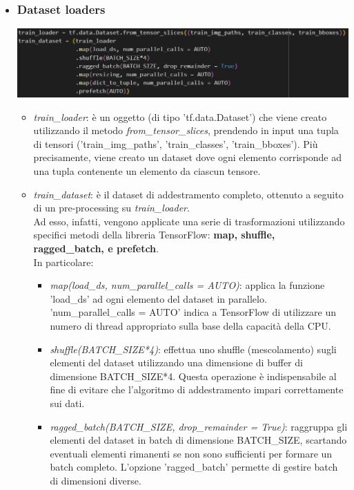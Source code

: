 \documentclass{report}
\begin{document}
\begin{itemize}
\item
\subsubsection{Dataset loaders}
\includegraphics[height=%
0.15\textheight]{loader}\\
\begin{itemize}
\item {\itshape train\_loader}: è un oggetto (di tipo 'tf.data.Dataset') che viene creato utilizzando il metodo {\itshape from\_tensor\_slices}, prendendo in input una tupla di tensori ('train\_img\_paths', 'train\_classes', 'train\_bboxes'). Più precisamente, viene creato un dataset dove ogni elemento corrisponde ad una tupla contenente un elemento da ciascun tensore.
\item {\itshape train\_dataset}: è il dataset di addestramento completo, ottenuto a seguito di un pre-processing su {\itshape train\_loader}.\\
Ad esso, infatti, vengono applicate una serie di trasformazioni utilizzando specifici metodi della libreria TensorFlow: \textbf{map, shuffle, ragged\_batch,  e prefetch}. \\
In particolare:\\
\begin{itemize}
\item {\itshape map(load\_ds, num\_parallel\_calls = AUTO)}: applica la funzione 'load\_ds' ad ogni elemento del dataset in parallelo. \\
'num\_parallel\_calls = AUTO' indica a TensorFlow di utilizzare un numero di thread appropriato sulla base della capacità della CPU.

\item {\itshape shuffle(BATCH\_SIZE*4)}: effettua uno shuffle (mescolamento) sugli elementi del dataset utilizzando una dimensione di buffer di dimensione BATCH\_SIZE*4. Questa operazione è indispensabile al fine di evitare che l'algoritmo di addestramento impari correttamente sui dati.

\item {\itshape ragged\_batch(BATCH\_SIZE, drop\_remainder = True)}: raggruppa gli elementi del dataset in batch di dimensione BATCH\_SIZE, scartando eventuali elementi rimanenti se non sono sufficienti per formare un batch completo. L'opzione 'ragged\_batch' permette di gestire batch di dimensioni diverse.


\end{itemize}
\end{itemize}
\end{itemize}
\end{document}
